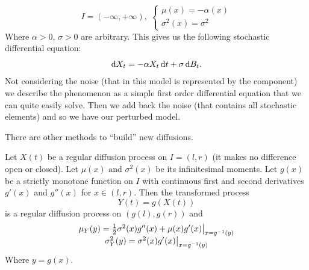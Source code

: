 \documentclass[12pt]{report}
\begin{document}
\begin{equation*}
	I=(-\infty,+\infty),\;\begin{cases}
		\mu(x)=-\alpha(x)\\
		\sigma^{2}(x)=\sigma^{2}
	\end{cases}
\end{equation*}
Where $\alpha>0$, $\sigma>0$ are arbitrary. This gives us the following stochastic differential equation:
\begin{equation*}
	\mathop{}\!\mathrm{d} X_{t}=-\alpha X_{t}\mathop{}\!\mathrm{d} t+\sigma\mathop{}\!\mathrm{d} B_{t}.
\end{equation*}
Not considering the noise (that in this model is represented by the \bwm{} component) we describe the phenomenon as a simple first order differential equation that we can quite easily solve. Then we add back the noise (that contains all stochastic elements) and so we have our perturbed model.\par
There are other methods to ``build'' new diffusions.
\begin{theorem}
	Let $X(t)$ be a regular diffusion process on $I=(l,r)$ (it makes no difference open or closed). Let $\mu(x)$ and $\sigma^{2}(x)$ be its infinitesimal moments. Let $g(x)$ be a strictly monotone function on $I$ with continuous first and second derivatives $g'(x)$ and $g''(x)$ for $x\in(l,r)$. Then the transformed process
	\begin{equation*}
		Y(t)=g(X(t))
	\end{equation*}
	is a regular diffusion process on $(g(l),g(r))$ and
	\begin{equation*}
		\begin{array}{c}
			\mu_{Y}(y)=\frac{1}{2}\sigma^{2}(x)g''(x)+\mu(x)g'(x)\big|_{x=g^{-1}(y)}\\
			\sigma^{2}_{Y}(y)=\sigma^{2}(x)g'(x)\big|_{x=g^{-1}(y)}
		\end{array}
	\end{equation*}
	Where $y=g(x)$.
\end{theorem}
\end{document}
